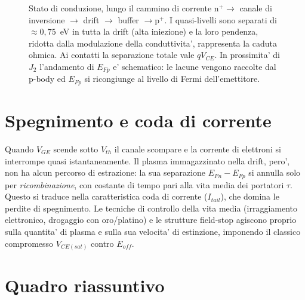 \documentclass[11pt,a4paper]{article}
\begin{document}
\begin{figure}[H]
\caption{Stato di conduzione, lungo il cammino di corrente
$\mathrm{n^{+}}\!\to$ canale di inversione $\to$ drift $\to$ buffer $\to
\mathrm{p^{+}}$. I quasi-livelli sono separati di $\approx 0{,}75$~eV in tutta
la drift (alta iniezione) e la loro pendenza, ridotta dalla modulazione della
conduttivita', rappresenta la caduta ohmica. Ai contatti la separazione totale
vale $qV_{CE}$. In prossimita' di $J_2$ l'andamento di $E_{Fp}$ e' schematico:
le lacune vengono raccolte dal p-body ed $E_{Fp}$ si ricongiunge al livello di
Fermi dell'emettitore.}
\label{fig:on}
\end{figure}

\section{Spegnimento e coda di corrente}

Quando $V_{GE}$ scende sotto $V_{th}$ il canale scompare e la corrente di
elettroni si interrompe quasi istantaneamente. Il plasma immagazzinato nella
drift, pero', non ha alcun percorso di estrazione: la sua separazione
$E_{Fn}-E_{Fp}$ si annulla solo per \emph{ricombinazione}, con costante di
tempo pari alla vita media dei portatori $\tau$. Questo si traduce nella
caratteristica coda di corrente ($I_{tail}$), che domina le perdite di
spegnimento. Le tecniche di controllo della vita media (irraggiamento
elettronico, drogaggio con oro/platino) e le strutture field-stop agiscono
proprio sulla quantita' di plasma e sulla sua velocita' di estinzione,
imponendo il classico compromesso $V_{CE(sat)}$ contro $E_{off}$.

\section{Quadro riassuntivo}
\end{document}
